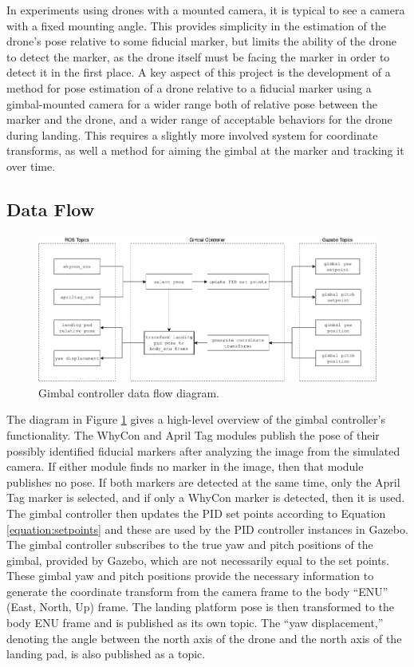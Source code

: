 In experiments using drones with a mounted camera, it is typical to see a camera with a fixed mounting angle. This provides simplicity in the estimation of the drone's pose relative to some fiducial marker, but limits the ability of the drone to detect the marker, as the drone itself must be facing the marker in order to detect it in the first place. A key aspect of this project is the development of a method for pose estimation of a drone relative to a fiducial marker using a gimbal-mounted camera for a wider range both of relative pose between the marker and the drone, and a wider range of acceptable behaviors for the drone during landing. This requires a slightly more involved system for coordinate transforms, as well a method for aiming the gimbal at the marker and tracking it over time.

\subsection{Data Flow}

\begin{figure}[ht]
    \centering
    \includegraphics[width=\textwidth]{images/gimbal_controller_diagram.png}
    \caption{Gimbal controller data flow diagram.}
    \label{fig:gimbal_controller_diagram}
\end{figure}

The diagram in Figure \ref{fig:gimbal_controller_diagram} gives a high-level overview of the gimbal controller's functionality. The WhyCon and April Tag modules publish the pose of their possibly identified fiducial markers after analyzing the image from the simulated camera. If either module finds no marker in the image, then that module publishes no pose. If both markers are detected at the same time, only the April Tag marker is selected, and if only a WhyCon marker is detected, then it is used. The gimbal controller then updates the PID set points according to Equation \ref{equation:setpoints} and these are used by the PID controller instances in Gazebo. The gimbal controller subscribes to the true yaw and pitch positions of the gimbal, provided by Gazebo, which are not necessarily equal to the set points. These gimbal yaw and pitch positions provide the necessary information to generate the coordinate transform from the camera frame to the body ``ENU'' (East, North, Up) frame. The landing platform pose is then transformed to the body ENU frame and is published as its own topic. The ``yaw displacement,'' denoting the angle between the north axis of the drone and the north axis of the landing pad, is also published as a topic. 

